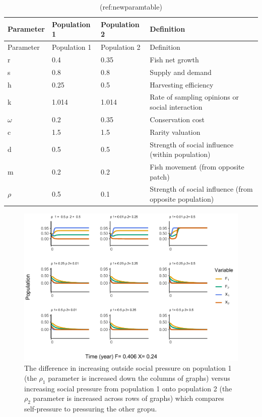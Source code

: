 \documentclass[
]{article}
\begin{document}
\begin{longtable}[]{@{}llll@{}}
\caption{\label{tab:NewParamTable}(ref:newparamtable) \label{NewParamTable}}\tabularnewline
\toprule\noalign{}
Parameter & Population 1 & Population 2 & Definition \\
\midrule\noalign{}
\endfirsthead
\toprule\noalign{}
Parameter & Population 1 & Population 2 & Definition \\
\midrule\noalign{}
\endhead
\bottomrule\noalign{}
\endlastfoot
r & 0.4 & 0.35 & Fish net growth \\
s & 0.8 & 0.8 & Supply and demand \\
h & 0.25 & 0.5 & Harvesting efficiency \\
k & 1.014 & 1.014 & Rate of sampling opinions or social interaction \\
\(\omega\) & 0.2 & 0.35 & Conservation cost \\
c & 1.5 & 1.5 & Rarity valuation \\
d & 0.5 & 0.5 & Strength of social influence (within population) \\
m & 0.2 & 0.2 & Fish movement (from opposite patch) \\
\(\rho\) & 0.5 & 0.1 & Strength of social influence (from opposite population) \\
\end{longtable}



\begin{figure}
\centering
\includegraphics{Review1_NewFigsNotes_files/figure-latex/influenceAsymGraph-1.pdf}
\caption{\label{fig:influenceAsymGraph}The difference in increasing outside social pressure on population 1 (the \(\rho_1\) parameter is increased down the columns of graphs) versus increasing social pressure from population 1 onto population 2 (the \(\rho_2\) parameter is increased across rows of graphs) which compares self-pressure to pressuring the other gropu. \label{influenceAsymGraph}}
\end{figure}
\end{document}
